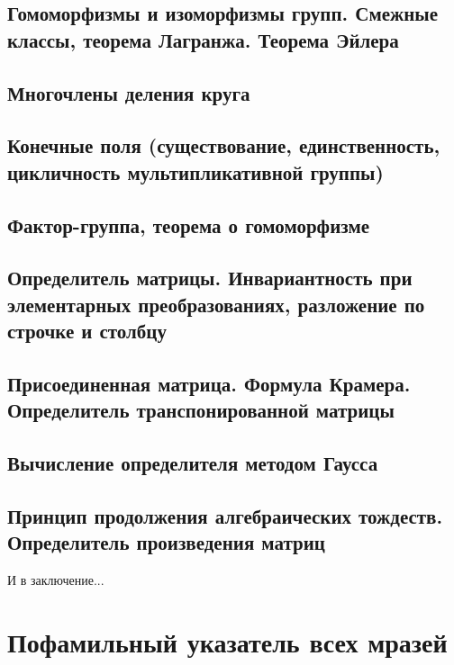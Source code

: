 \documentclass[a4paper,100pt]{article}
\theoremstyle{indented}
\theoremstyle{definition}
\theoremstyle{remark}
\begin{document}
\subsection{Гомоморфизмы и изоморфизмы групп. Смежные классы, теорема Лагранжа. Теорема Эйлера}

\subsection{Многочлены деления круга}

\subsection{Конечные поля (существование, единственность, цикличность мультипликативной группы)}

\subsection{Фактор-группа, теорема о гомоморфизме}

\subsection{Определитель матрицы. Инвариантность при элементарных преобразованиях, разложение по строчке и столбцу}

\subsection{Присоединенная матрица. Формула Крамера. Определитель транспонированной матрицы}

\subsection{Вычисление определителя методом Гаусса}

\subsection{Принцип продолжения алгебраических тождеств. Определитель произведения матриц}



\newpage

\hypertarget{t2}{И в заключение...}



\section{Пофамильный указатель всех мразей}
\end{document}
